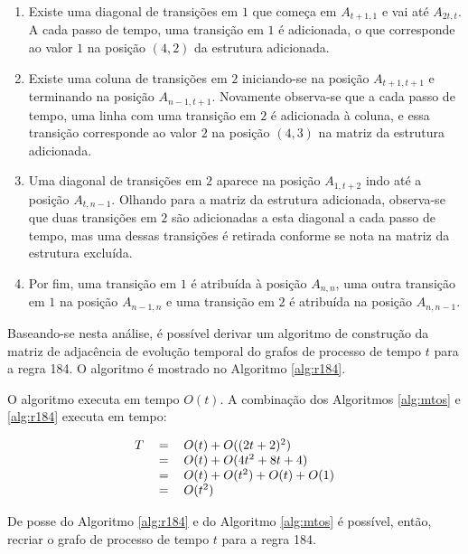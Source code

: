\documentclass[12pt,a4paper]{article}
\begin{document}
\begin{enumerate}
\item Existe uma diagonal de transições em $1$ que começa em $A_{t+1,1}$
e vai até $A_{2t,t}$. A cada passo de tempo, uma transição em $1$ é adicionada,
o que corresponde ao valor $1$ na posição $(4,2)$ da estrutura adicionada.

\item Existe uma coluna de transições em $2$ iniciando-se na posição
$A_{t+1,t+1}$ e terminando na posição $A_{n-1,t+1}$. Novamente observa-se
que a cada passo de tempo, uma linha com uma transição em $2$ é adicionada à
coluna, e essa transição corresponde ao valor $2$ na posição $(4,3)$ na matriz da
estrutura adicionada.

\item Uma diagonal de transições em $2$ aparece na posição $A_{1,t+2}$ indo
até a posição $A_{t,n-1}$. Olhando para a matriz da estrutura adicionada,
observa-se que duas transições em $2$ são adicionadas a esta diagonal a cada
passo de tempo, mas uma dessas transições é retirada conforme se nota na
matriz da estrutura excluída.

\item Por fim, uma transição em $1$ é atribuída à posição $A_{n,n}$, uma
outra transição em $1$ na posição $A_{n-1,n}$ e uma transição em $2$ é
atribuída na posição $A_{n,n-1}$.
\end{enumerate}

Baseando-se nesta análise, é possível derivar um algoritmo de construção da
matriz de adjacência de evolução temporal do grafos de processo de tempo $t$ para a
regra 184. O algoritmo é mostrado no Algoritmo \ref{alg:r184}.

O algoritmo executa em tempo $O(t)$. A combinação dos Algoritmos
\ref{alg:mtos} e \ref{alg:r184} executa em tempo:

\begin{equation}
\begin{tabular}{ r c l }
\(T\) & \(=\) & \(O(t) + O((2t+2)^2)\) \\
  & \(=\) & \(O(t) + O(4t^2+8t+4)\) \\
  & \(=\) & \(O(t) + O(t^2) + O(t) + O(1)\) \\
  & \(=\) & \(O(t^2)\)
\end{tabular}
\end{equation}

De posse do Algoritmo \ref{alg:r184} e do Algoritmo \ref{alg:mtos} é
possível, então, recriar o grafo de processo de tempo $t$ para a regra 184.
\end{document}
